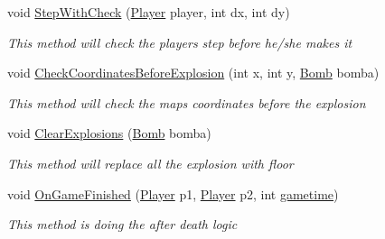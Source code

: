 \begin{DoxyCompactItemize}
void \mbox{\hyperlink{class_bomberman_1_1_business_logic_1_1_game_logic_afd8c68bf3f209cf71274a879e722b548}{Step\+With\+Check}} (\mbox{\hyperlink{class_bomberman_1_1_model_1_1_player}{Player}} player, int dx, int dy)
\begin{DoxyCompactList}\small\item\em This method will check the players step before he/she makes it \end{DoxyCompactList}\item 
void \mbox{\hyperlink{class_bomberman_1_1_business_logic_1_1_game_logic_ad5a13675d1f82cd948fbc5c8d92bb368}{Check\+Coordinates\+Before\+Explosion}} (int x, int y, \mbox{\hyperlink{class_bomberman_1_1_model_1_1_bomb}{Bomb}} bomba)
\begin{DoxyCompactList}\small\item\em This method will check the maps coordinates before the explosion \end{DoxyCompactList}\item 
void \mbox{\hyperlink{class_bomberman_1_1_business_logic_1_1_game_logic_a287610b4fd08e0fcc5595c56924aaff4}{Clear\+Explosions}} (\mbox{\hyperlink{class_bomberman_1_1_model_1_1_bomb}{Bomb}} bomba)
\begin{DoxyCompactList}\small\item\em This method will replace all the explosion with floor \end{DoxyCompactList}\item 
void \mbox{\hyperlink{class_bomberman_1_1_business_logic_1_1_game_logic_ae70a97fb33a2469c2914b7b266592ad7}{On\+Game\+Finished}} (\mbox{\hyperlink{class_bomberman_1_1_model_1_1_player}{Player}} p1, \mbox{\hyperlink{class_bomberman_1_1_model_1_1_player}{Player}} p2, int \mbox{\hyperlink{class_bomberman_1_1_business_logic_1_1_game_logic_a62af8cf407009e7f8e4b444b152a81c9}{gametime}})
\begin{DoxyCompactList}\small\item\em This method is doing the after death logic \end{DoxyCompactList}\end{DoxyCompactItemize}
